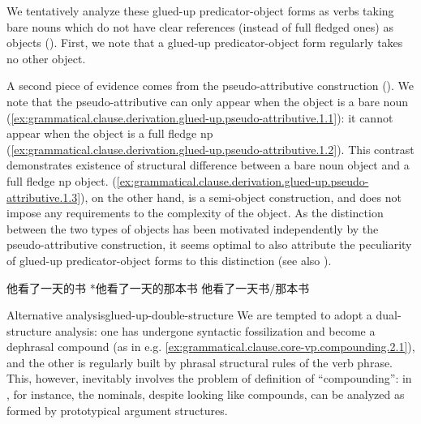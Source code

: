 \documentclass[UTF8, a4paper, oneside, scheme=plain, 12pt]{ctexrep}
\begin{document}
We tentatively analyze these glued-up predicator-object forms as 
verbs taking bare nouns which do not have clear references (instead of full fledged ones) as objects
().
First, we note that a glued-up predicator-object form regularly takes no other object.

A second piece of evidence comes from the pseudo-attributive construction
().
We note that the pseudo-attributive can only appear
when the object is a bare noun 
(\ref{ex:grammatical.clause.derivation.glued-up.pseudo-attributive.1.1}):
it cannot appear when the object is a full fledge \ac{np}
(\ref{ex:grammatical.clause.derivation.glued-up.pseudo-attributive.1.2}).
This contrast demonstrates existence of structural difference
between a bare noun object and a full fledge \ac{np} object.
(\ref{ex:grammatical.clause.derivation.glued-up.pseudo-attributive.1.3}),
on the other hand, is a semi-object construction,
and does not impose any requirements to the complexity of the object.
As the distinction between the two types of objects has been motivated independently by the pseudo-attributive construction,
it seems optimal to also attribute the peculiarity of glued-up predicator-object forms to this distinction
(see also ).

\begin{exe}
    \ex\label{ex:grammatical.clause.derivation.glued-up.pseudo-attributive.1}
    \begin{xlist}
        \ex\label{ex:grammatical.clause.derivation.glued-up.pseudo-attributive.1.1} 他看了一天的书
        \ex\label{ex:grammatical.clause.derivation.glued-up.pseudo-attributive.1.2} *他看了一天的那本书
        \ex\label{ex:grammatical.clause.derivation.glued-up.pseudo-attributive.1.3} 他看了一天书/那本书
    \end{xlist}
\end{exe}

\begin{infobox}{Alternative analysis}{glued-up-double-structure}
    We are tempted to adopt a dual-structure analysis:
    one has undergone syntactic fossilization and become a dephrasal compound
    (as in e.g. \ref{ex:grammatical.clause.core-vp.compounding.2.1}), 
    and the other is regularly built by phrasal structural rules of the verb phrase.
    This, however, inevitably involves the problem of definition of ``compounding'':
    in , for instance,
    the nominals, despite looking like compounds, can be analyzed as
    formed by prototypical argument structures.
\end{infobox}
\end{document}
